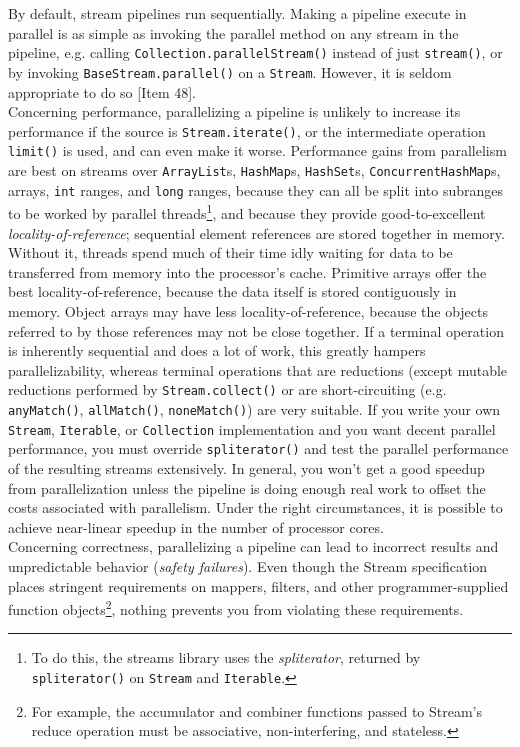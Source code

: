 \documentclass[table, xcdraw]{article}%
\begin{document}
By default, stream pipelines run sequentially. Making a pipeline execute in parallel is as simple as invoking the parallel method on any stream in the pipeline, e.g. calling \texttt{Collection.parallelStream()} instead of just \texttt{stream()}, or by invoking \texttt{BaseStream.parallel()} on a \texttt{Stream}. However, it is seldom appropriate to do so [Item 48].\\
Concerning performance, parallelizing a pipeline is unlikely to increase its performance if the source is \texttt{Stream.iterate()}, or the intermediate operation \texttt{limit()} is used, and can even make it worse. Performance gains from parallelism are best on streams over \texttt{ArrayList}s, \texttt{HashMap}s, \texttt{HashSet}s, \texttt{ConcurrentHashMap}s, arrays, \texttt{int}
ranges, and \texttt{long} ranges, because they can all be split into subranges to be worked by parallel threads\footnote{To do this, the streams library uses the \emph{spliterator}, returned by \texttt{spliterator()} on \texttt{Stream} and \texttt{Iterable}.}, and because they provide good-to-excellent \emph{locality-of-reference}; sequential element references are stored together in memory. Without it, threads spend much of their time idly waiting for data to be transferred from memory into the processor’s cache. Primitive arrays offer the best locality-of-reference, because the data itself is stored contiguously in memory. Object arrays may have less locality-of-reference, because the objects referred to by those references may not be close together. If a terminal operation is inherently sequential and does a lot of work, this greatly hampers parallelizability, whereas terminal operations that are reductions (except mutable reductions performed by \texttt{Stream.collect()} or are short-circuiting (e.g. \texttt{anyMatch()}, \texttt{allMatch()}, \texttt{noneMatch()}) are very suitable. If you write your own \texttt{Stream}, \texttt{Iterable}, or \texttt{Collection} implementation and you want decent parallel performance, you must override \texttt{spliterator()} and test the parallel performance of the resulting streams extensively. In general, you won’t get a good speedup from parallelization unless the pipeline is doing enough real work to offset the costs associated with parallelism. Under the right circumstances, it is possible to
achieve near-linear speedup in the number of processor cores.\\
Concerning correctness, parallelizing a pipeline can lead to incorrect results and unpredictable behavior (\emph{safety failures}). Even though the Stream specification places stringent requirements on mappers, filters, and other programmer-supplied function objects\footnote{For example, the accumulator and combiner functions passed to Stream’s reduce operation must be associative, non-interfering, and stateless.}, nothing prevents you from violating these requirements.
\end{document}
